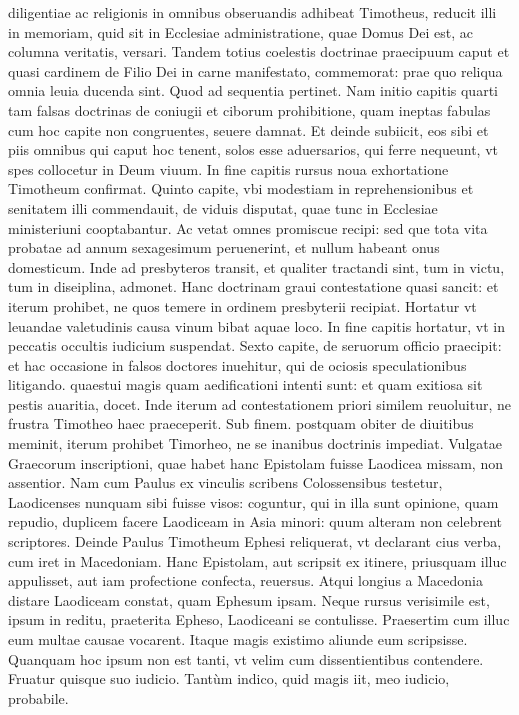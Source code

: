 \documentclass{article}
\begin{document}
\begin{pages}
diligentiae ac religionis in omnibus obseruandis adhibeat Timotheus, reducit illi in memoriam, quid sit in Ecclesiae administratione, quae Domus Dei est, ac columna veritatis, versari. Tandem totius coelestis doctrinae praecipuum caput et quasi cardinem de Filio Dei in carne manifestato, commemorat: prae quo reliqua omnia leuia ducenda sint. Quod ad sequentia pertinet. Nam initio capitis quarti tam falsas doctrinas de coniugii et ciborum prohibitione, quam ineptas fabulas cum hoc capite non congruentes, seuere damnat. Et deinde subiicit, eos sibi et piis omnibus qui caput hoc tenent, solos esse aduersarios, qui ferre nequeunt, vt spes collocetur in Deum viuum. In fine capitis rursus noua exhortatione Timotheum confirmat. Quinto capite, vbi modestiam in reprehensionibus et senitatem illi commendauit, de viduis disputat, quae tunc in Ecclesiae ministeriuni cooptabantur. Ac vetat omnes promiscue recipi: sed que tota vita probatae ad annum sexagesimum peruenerint, et nullum habeant onus domesticum. Inde ad presbyteros transit, et qualiter tractandi sint, tum in victu, tum in diseiplina, admonet. Hanc doctrinam graui contestatione quasi sancit: et iterum prohibet, ne quos temere in ordinem presbyterii recipiat. Hortatur vt leuandae valetudinis causa vinum bibat aquae loco. In fine capitis hortatur, vt in peccatis occultis iudicium suspendat. Sexto capite, de seruorum officio praecipit: et hac occasione in falsos doctores inuehitur, qui de ociosis speculationibus litigando. quaestui magis quam aedificationi intenti sunt: et quam exitiosa sit pestis auaritia, docet. Inde iterum ad contestationem priori similem reuoluitur, ne frustra Timotheo haec praeceperit. Sub finem. postquam obiter de diuitibus meminit, iterum prohibet Timorheo, ne se inanibus doctrinis impediat. Vulgatae Graecorum inscriptioni, quae habet hanc Epistolam fuisse Laodicea missam, non assentior. Nam cum Paulus ex vinculis scribens Colossensibus testetur, Laodicenses nunquam sibi fuisse visos: coguntur, qui in illa sunt opinione, quam repudio, duplicem facere Laodiceam in Asia minori: quum alteram non celebrent scriptores. Deinde Paulus Timotheum Ephesi reliquerat, vt declarant cius verba, cum iret in Macedoniam. Hanc Epistolam, aut scripsit ex itinere, priusquam illuc  \pend\pstart appulisset, aut iam profectione confecta, reuersus. Atqui longius a Macedonia distare Laodiceam constat, quam Ephesum ipsam. Neque rursus verisimile est, ipsum in reditu, praeterita Epheso, Laodiceani se contulisse. Praesertim cum illuc eum multae causae vocarent. Itaque magis existimo aliunde eum scripsisse. Quanquam hoc ipsum non est tanti, vt velim cum dissentientibus contendere. Fruatur quisque suo iudicio. Tantùm indico, quid magis iit, meo iudicio, probabile.  \pend
{}
{}

\end{pages}
\end{document}
